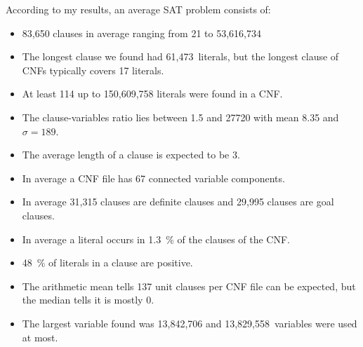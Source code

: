 According to my results, an average SAT problem consists of:
\begin{itemize}
  \item 83,650 clauses in average ranging from 21 to 53,616,734
  \item The longest clause we found had 61,473~literals, but the longest clause of CNFs typically covers 17 literals.
  \item At least 114 up to 150,609,758 literals were found in a CNF.
  \item The clause-variables ratio lies between 1.5 and 27720 with mean 8.35 and $\sigma = 189$.
  \item The average length of a clause is expected to be 3.
  \item In average a CNF file has 67 connected variable components.
  \item In average 31,315 clauses are definite clauses and 29,995 clauses are goal clauses.
  \item In average a literal occurs in 1.3~\% of the clauses of the CNF.
  \item 48~\% of literals in a clause are positive.
  \item The arithmetic mean tells 137 unit clauses per CNF file can be expected, but the median tells it is mostly 0.
  \item The largest variable found was 13,842,706 and 13,829,558~variables were used at most.
\end{itemize}
